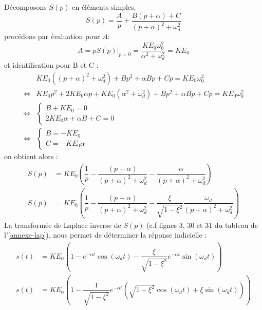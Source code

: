 Décomposons $S(p)$ en éléments simples,
\[
S(p)=\dfrac{A}{p} + \dfrac{B(p+\alpha)+C}{(p+\alpha)^2+\omega^2_d}
\]
procédons par évaluation pour $A$:
\[
A=pS(p)\Big|_{p=0}=\dfrac{KE_0\omega^2_0}{\alpha^2+\omega^2_d}=KE_0
\]
et identification pour B et C :
\begin{align*}
    &KE_0((p+\alpha)^2+\omega^2_d) + Bp^2+\alpha Bp+Cp = KE_0\omega^2_0 \\
    \iff & KE_0p^2+2KE_0\alpha p+KE_0(\alpha^2+\omega^2_d) + Bp^2+\alpha Bp+Cp 
    = KE_0\omega^2_0 \\ 
    \iff & 
    \begin{cases}
      B+KE_0 = 0 \\ 
      2KE_0\alpha+\alpha B+C=0
    \end{cases} \\
    \iff & \begin{cases}
            B=-KE_0     \\
            C=-KE_0\alpha
            \end{cases}
\end{align*}
on obtient alors :
\begin{align*}
    S(p)&=KE_0\left(\dfrac{1}{p} - 
          \dfrac{(p+\alpha)}{(p+\alpha)^2+\omega^2_d} - 
          \dfrac{\alpha}{(p+\alpha)^2+\omega^2_d}\right) \\
    S(p)&=KE_0\left(\dfrac{1}{p} - 
          \dfrac{(p+\alpha)}{(p+\alpha)^2+\omega^2_d} - 
          \dfrac{\xi}{\sqrt{1-\xi^2}} 
          \dfrac{\omega_d}{(p+\alpha)^2+\omega^2_d}\right)
\end{align*}
La transformée de Laplace inverse de $S(p)$ (c.f lignes 3, 30 et 
31 du tableau de l'\cref{annexe-lap}), nous permet de déterminer 
la réponse indicielle :
\begin{align*}
    s(t) &= KE_0\left(1 - 
            e^{-\alpha t}\cos{(\omega_d t)} - 
            \dfrac{\xi}{\sqrt{1-\xi^2}} 
            e^{-\alpha t}\sin{(\omega_d t)}\right) \\
    s(t) &= KE_0\left( 1- 
            \dfrac{1}{\sqrt{1-\xi^2}} 
            e^{-\alpha t}
            \left ( \sqrt{1-\xi^2}\cos{(\omega_d t)} 
            + \xi\sin{(\omega_d t)}\right)\right) \\
\end{align*}
